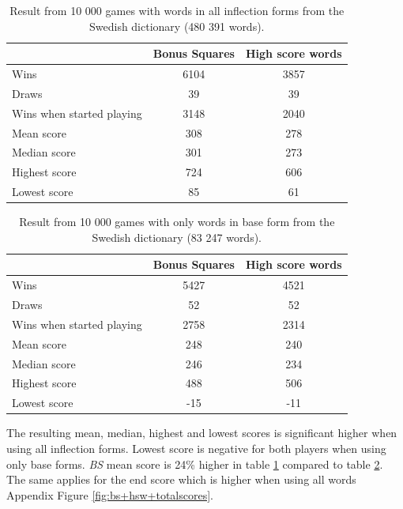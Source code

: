 \documentclass[a4paper, 12pt]{report}
\begin{document}
\begin{table}[h]
\centering
    \begin{tabular}{ l | c | c }
   	& Bonus Squares & High score words \\
   	\hline
   	Wins & 6104 & 3857 \\
   	Draws & 39 & 39 \\   	
	Wins when started playing & 3148 & 2040 \\   	
	Mean score & 308 & 278 \\
	Median score & 301 & 273 \\	 	 
	Highest score & 724 & 606 \\
	Lowest score & 85 & 61 \\		
    \end{tabular}
\caption{Result from 10 000 games with words in all inflection forms from the Swedish dictionary (480 391 words).}
\label{table:bs+hsw+allwords}
\end{table}

\begin{table}[h]
\centering
    \begin{tabular}{ l | c | c }
   	& Bonus Squares & High score words \\
   	\hline
   	Wins & 5427 & 4521 \\
   	Draws & 52 & 52 \\
	Wins when started playing & 2758 & 2314 \\   	
	Mean score & 248 & 240 \\
	Median score & 246 & 234 \\	 	 
	Highest score & 488 & 506 \\
	Lowest score & -15 & -11 \\		
    \end{tabular}
\caption{Result from 10 000 games with only words in base form from the Swedish dictionary (83 247 words).}
\label{table:bs+hsw+baseforms}
\end{table}

The resulting mean, median, highest and lowest scores is significant higher when using all inflection forms. Lowest score is negative for both players when using only base forms. \emph{BS} mean score is 24\% higher in table \ref{table:bs+hsw+allwords} compared to table \ref{table:bs+hsw+baseforms}. The same applies for the end score which is higher when using all words Appendix Figure \ref{fig:bs+hsw+totalscores}.
\end{document}
